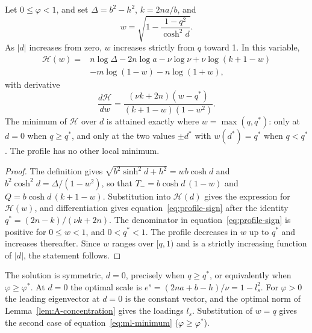 \begin{applemma}
\label{lem:A-profile}
Let $0\le\varphi<1$, and set $\Delta=b^2-h^2$, $k=2na/b$, and
\[
w=\sqrt{1-\frac{1-q^2}{\cosh^2d}}.
\]
As $|d|$ increases from zero, $w$ increases strictly from $q$ toward 1. In this variable,
\begin{align*}
\mathcal H(w)={}&n\log \Delta-2n\log a-\nu \log \nu
+\nu \log(k+1-w)\\
&-m\log(1-w)-n\log(1+w),
\end{align*}
with derivative
\begin{equation}
\frac{d\mathcal H}{dw}
=\frac{(\nu k+2n)(w-q^*)}{(k+1-w)(1-w^2)}.
\label{eq:profile-sign}
\end{equation}
The minimum of $\mathcal H$ over $d$ is attained exactly where $w=\max(q,q^*)$: only at $d=0$ when $q\ge q^*$, and only at the two values $\pm d^*$ with $w(d^*)=q^*$ when $q<q^*$. The profile has no other local minimum.
\end{applemma}

\begin{proof}
The definition gives $\sqrt{b^2\sinh^2d+h^2}=wb\cosh d$ and $b^2\cosh^2d=\Delta/(1-w^2)$, so that $T_-=b\cosh d\,(1-w)$ and $Q=b\cosh d\,(k+1-w)$. Substitution into $\mathcal H(d)$ gives the expression for $\mathcal H(w)$, and differentiation gives equation~\eqref{eq:profile-sign} after the identity $q^*=(2n-k)/(\nu k+2n)$. The denominator in equation~\eqref{eq:profile-sign} is positive for $0\le w<1$, and $0<q^*<1$. The profile decreases in $w$ up to $q^*$ and increases thereafter. Since $w$ ranges over $[q,1)$ and is a strictly increasing function of $|d|$, the statement follows.
\end{proof}

The solution is symmetric, $d=0$, precisely when $q\ge q^*$, or equivalently when $\varphi\ge\varphi^*$. At $d=0$ the optimal scale is $e^s=(2na+b-h)/\nu=1-l_s^2$. For $\varphi>0$ the leading eigenvector at $d=0$ is the constant vector, and the optimal norm of Lemma~\ref{lem:A-concentration} gives the loadings $l_s$. Substitution of $w=q$ gives the second case of equation~\eqref{eq:ml-minimum} ($\varphi\ge\varphi^*$).

